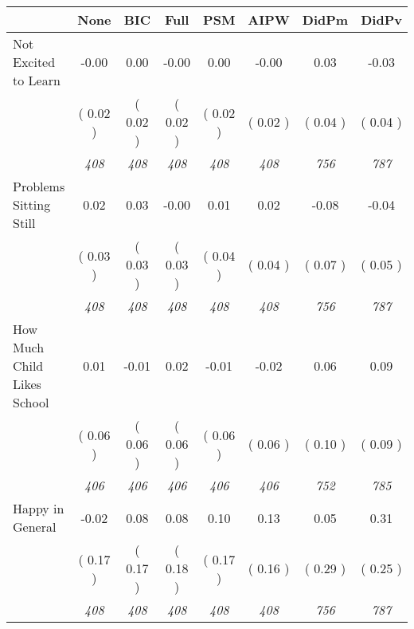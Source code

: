 \begin{tabular}{l c c c c c c c}
\toprule
 & None & BIC & Full & PSM & AIPW & DidPm & DidPv \\
\midrule
Not Excited to Learn &     -0.00 &      0.00 &     -0.00 &      0.00 &     -0.00 &      0.03 &     -0.03 \\
& (     0.02 ) & (     0.02 ) & (     0.02 ) & (     0.02 ) & (     0.02 ) & (     0.04 ) & (     0.04 ) \\
& \textit{ 408 } & \textit{ 408 } & \textit{ 408 } & \textit{ 408 } & \textit{ 408 } & \textit{ 756 } & \textit{ 787 } \\
Problems Sitting Still &      0.02 &      0.03 &     -0.00 &      0.01 &      0.02 &     -0.08 &     -0.04 \\
& (     0.03 ) & (     0.03 ) & (     0.03 ) & (     0.04 ) & (     0.04 ) & (     0.07 ) & (     0.05 ) \\
& \textit{ 408 } & \textit{ 408 } & \textit{ 408 } & \textit{ 408 } & \textit{ 408 } & \textit{ 756 } & \textit{ 787 } \\
How Much Child Likes School &      0.01 &     -0.01 &      0.02 &     -0.01 &     -0.02 &      0.06 &      0.09 \\
& (     0.06 ) & (     0.06 ) & (     0.06 ) & (     0.06 ) & (     0.06 ) & (     0.10 ) & (     0.09 ) \\
& \textit{ 406 } & \textit{ 406 } & \textit{ 406 } & \textit{ 406 } & \textit{ 406 } & \textit{ 752 } & \textit{ 785 } \\
Happy in General &     -0.02 &      0.08 &      0.08 &      0.10 &      0.13 &      0.05 &      0.31 \\
& (     0.17 ) & (     0.17 ) & (     0.18 ) & (     0.17 ) & (     0.16 ) & (     0.29 ) & (     0.25 ) \\
& \textit{ 408 } & \textit{ 408 } & \textit{ 408 } & \textit{ 408 } & \textit{ 408 } & \textit{ 756 } & \textit{ 787 } \\
\bottomrule
\end{tabular}
